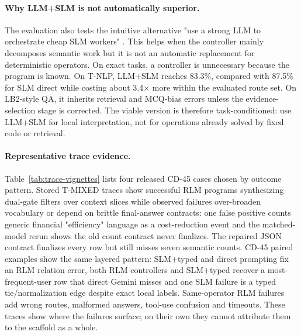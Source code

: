 \documentclass[letterpaper]{article}
\begin{document}
\paragraph{Why LLM+SLM is not automatically superior.}
The evaluation also tests the intuitive alternative "use a strong LLM to orchestrate cheap SLM workers" \citep{narayan2025minions}. This helps when the controller mainly decomposes semantic work but it is not an automatic replacement for deterministic operators. On exact tasks, a controller is unnecessary because the program is known. On T-NLP, LLM+SLM reaches 83.3\%, compared with 87.5\% for SLM direct while costing about 3.4$\times$ more within the evaluated route set. On LB2-style QA, it inherits retrieval and MCQ-bias errors unless the evidence-selection stage is corrected. The viable version is therefore task-conditioned: use LLM+SLM for local interpretation, not for operations already solved by fixed code or retrieval.

\paragraph{Representative trace evidence.}
Table~\ref{tab:trace-vignettes} lists four released CD-45 cases chosen by outcome pattern. Stored T-MIXED traces show successful RLM programs synthesizing dual-gate filters over context slices while observed failures over-broaden vocabulary or depend on brittle final-answer contracts: one false positive counts generic financial "efficiency" language as a cost-reduction event and the matched-model rerun shows the old count contract never finalizes. The repaired JSON contract finalizes every row but still misses seven semantic counts. CD-45 paired examples show the same layered pattern: SLM+typed and direct prompting fix an RLM relation error, both RLM controllers and SLM+typed recover a most-frequent-user row that direct Gemini misses and one SLM failure is a typed tie/normalization edge despite exact local labels. Same-operator RLM failures add wrong routes, malformed answers, tool-use confusion and timeouts. These traces show where the failures surface; on their own they cannot attribute them to the scaffold as a whole.
\end{document}
